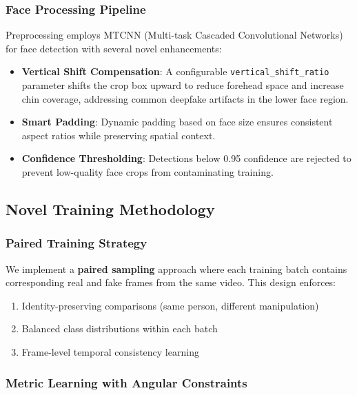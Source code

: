 \documentclass[11pt,a4paper]{article}
\begin{document}
\subsubsection{Face Processing Pipeline}

Preprocessing employs MTCNN (Multi-task Cascaded Convolutional Networks) for face detection with several novel enhancements:

\begin{itemize}
    \item \textbf{Vertical Shift Compensation}: A configurable \texttt{vertical\_shift\_ratio} parameter shifts the crop box upward to reduce forehead space and increase chin coverage, addressing common deepfake artifacts in the lower face region.
    
    \item \textbf{Smart Padding}: Dynamic padding based on face size ensures consistent aspect ratios while preserving spatial context.
    
    \item \textbf{Confidence Thresholding}: Detections below 0.95 confidence are rejected to prevent low-quality face crops from contaminating training.
\end{itemize}

\subsection{Novel Training Methodology}

\subsubsection{Paired Training Strategy}

We implement a \textbf{paired sampling} approach where each training batch contains corresponding real and fake frames from the same video. This design enforces:

\begin{enumerate}
    \item Identity-preserving comparisons (same person, different manipulation)
    \item Balanced class distributions within each batch
    \item Frame-level temporal consistency learning
\end{enumerate}

\subsubsection{Metric Learning with Angular Constraints}
\end{document}
